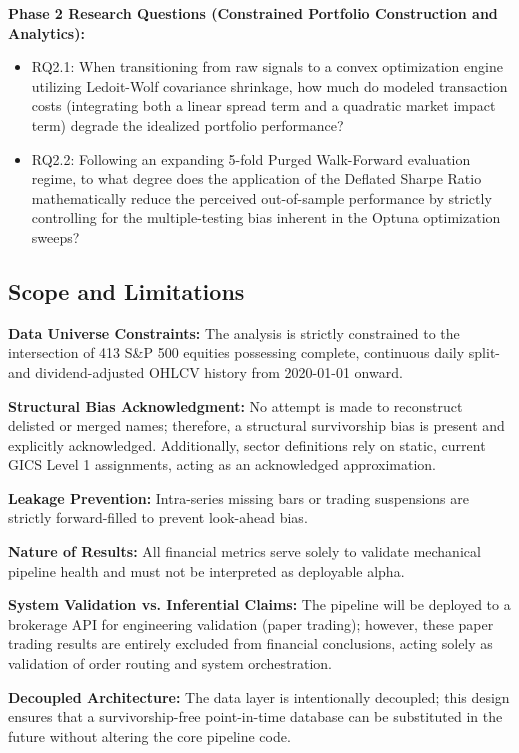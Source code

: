 \documentclass[twoside,final]{hcmut-report}
\begin{document}
\textbf{Phase 2 Research Questions (Constrained Portfolio Construction and Analytics):}
\begin{itemize}
  \item RQ2.1: When transitioning from raw signals to a convex optimization engine utilizing Ledoit-Wolf covariance shrinkage, how much do modeled transaction costs (integrating both a linear spread term and a quadratic market impact term) degrade the idealized portfolio performance?
  \item RQ2.2: Following an expanding 5-fold Purged Walk-Forward evaluation regime, to what degree does the application of the Deflated Sharpe Ratio mathematically reduce the perceived out-of-sample performance by strictly controlling for the multiple-testing bias inherent in the Optuna optimization sweeps?
\end{itemize}

\subsection{Scope and Limitations}

\textbf{Data Universe Constraints:} The analysis is strictly constrained to the intersection of 413 S\&P 500 equities possessing complete, continuous daily split- and dividend-adjusted OHLCV history from 2020-01-01 onward.

\textbf{Structural Bias Acknowledgment:} No attempt is made to reconstruct delisted or merged names; therefore, a structural survivorship bias is present and explicitly acknowledged. Additionally, sector definitions rely on static, current GICS Level 1 assignments, acting as an acknowledged approximation.

\textbf{Leakage Prevention:} Intra-series missing bars or trading suspensions are strictly forward-filled to prevent look-ahead bias.

\textbf{Nature of Results:} All financial metrics serve solely to validate mechanical pipeline health and must not be interpreted as deployable alpha.

\textbf{System Validation vs. Inferential Claims:} The pipeline will be deployed to a brokerage API for engineering validation (paper trading); however, these paper trading results are entirely excluded from financial conclusions, acting solely as validation of order routing and system orchestration.

\textbf{Decoupled Architecture:} The data layer is intentionally decoupled; this design ensures that a survivorship-free point-in-time database can be substituted in the future without altering the core pipeline code.
\end{document}
